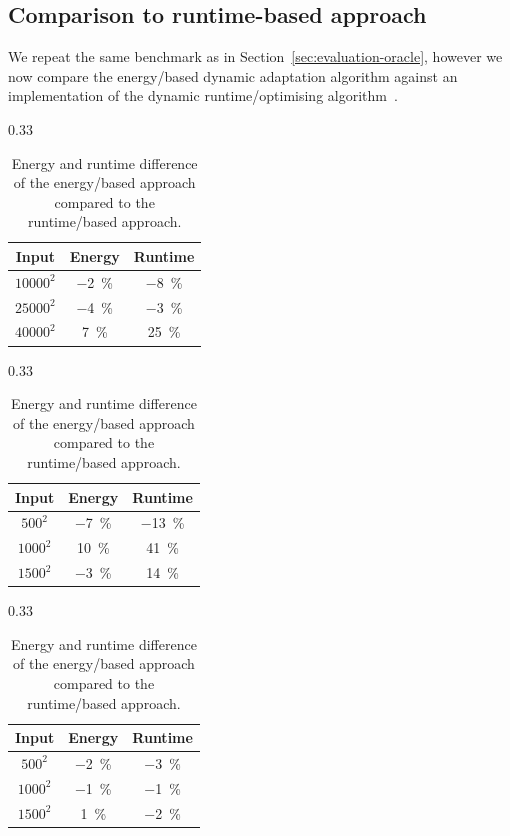 \subsection{Comparison to runtime-based approach}\label{sec:evaluation-runtime}
We repeat the same benchmark as in Section~\ref{sec:evaluation-oracle}, however we now compare the energy\-/based dynamic adaptation algorithm against an implementation of the dynamic runtime\-/optimising algorithm~\cite{gordon2015dynamic}.

\begin{table}[ht]
  \begin{subtable}{0.33\linewidth}
    \centering
    \begin{tabular}{ccc}\toprule
      Input & Energy & Runtime \\\midrule
      $10000^2$ & \qty{-2}{\percent} & \qty{-8}{\percent} \\
      $25000^2$ & \qty{-4}{\percent} & \qty{-3}{\percent} \\
      $40000^2$ & \qty{7}{\percent}  & \qty{25}{\percent} \\
    \bottomrule\end{tabular}%
    \caption{Nine-point stencil.}%
    \label{tab:rt-stencil}
  \end{subtable}%
  \hfill
  \begin{subtable}{0.33\linewidth}
    \centering
    \begin{tabular}{ccc}\toprule
      Input & Energy & Runtime \\\midrule
      $ 500^2$ & \qty{-7}{\percent} & \qty{-13}{\percent} \\
      $1000^2$ & \qty{10}{\percent} & \qty{41}{\percent} \\
      $1500^2$ & \qty{-3}{\percent} & \qty{14}{\percent} \\
    \bottomrule\end{tabular}%
    \caption{Matrix multiplication.}%
    \label{tab:rt-matmul}
  \end{subtable}%
  \hfill
  \begin{subtable}{0.33\linewidth}
    \centering
    \begin{tabular}{ccc}\toprule
      Input & Energy & Runtime \\\midrule
      $ 500^2$ & \qty{-2}{\percent} & \qty{-3}{\percent} \\
      $1000^2$ & \qty{-1}{\percent} & \qty{-1}{\percent} \\
      $1500^2$ & \qty{1}{\percent}  & \qty{-2}{\percent} \\
    \bottomrule\end{tabular}%
    \caption{Rust implementation.}%
    \label{tab:rt-rust}
  \end{subtable}%
  \caption{Energy and runtime difference of the energy\-/based approach compared to the runtime\-/based approach.}%
  \label{fig:rt}
\end{table}

